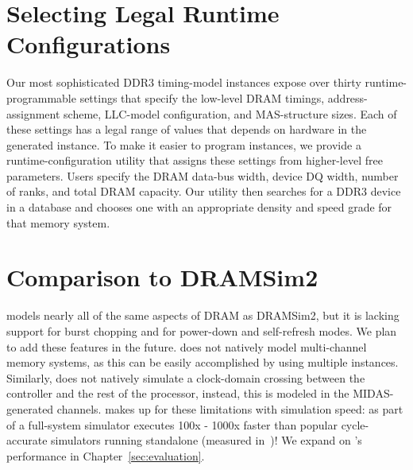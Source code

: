 \section{Selecting Legal Runtime Configurations}
Our most sophisticated DDR3 timing-model instances expose over thirty
runtime-programmable settings that specify the low-level DRAM timings,
address-assignment scheme, LLC-model configuration, and MAS-structure sizes.
Each of these settings has a legal range of values that depends on hardware in
the generated instance. To make it easier to program instances, we provide a
runtime-configuration utility that assigns these settings
from higher-level free parameters.
Users specify the DRAM data-bus width,
device DQ width, number of ranks, and total DRAM capacity. Our utility
then searches for a DDR3 device in a database and chooses one with an appropriate
density and speed grade for that memory system.

\section{Comparison to DRAMSim2} \PNAME models nearly all of the same
aspects of DRAM as DRAMSim2, but it is lacking support for burst
chopping and for power-down and self-refresh modes.
We plan to add these features in the future. \PNAME does not natively model
multi-channel memory systems, as this can be easily accomplished by using
multiple instances. Similarly, \PNAME does not natively simulate a clock-domain
crossing between the controller and the rest of the processor, instead, this is modeled in the MIDAS-generated channels.  \PNAME makes up for these
limitations with simulation speed: as part of a full-system
simulator \PNAME executes  100x - 1000x faster than popular cycle-accurate
simulators running standalone (measured in~\cite{ramulator})! We expand on
\PNAME's performance in Chapter~\ref{sec:evaluation}.
